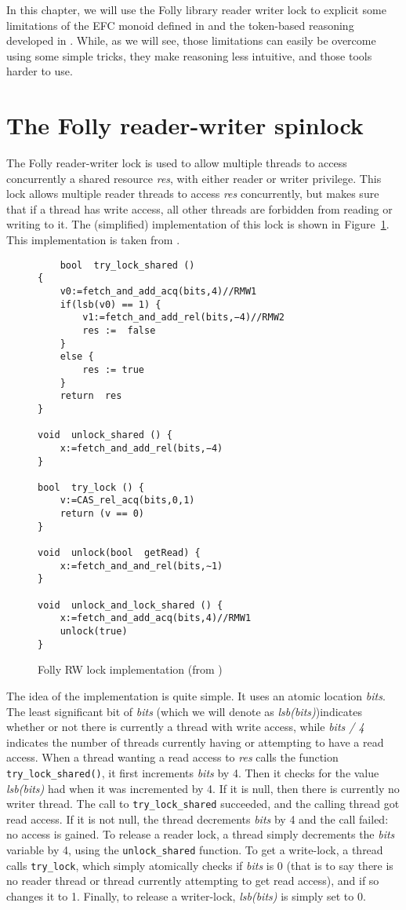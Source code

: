 \label{sec1}
In this chapter, we will use the Folly library reader writer lock \cite{follyRW} to explicit some limitations of the EFC monoid defined in \cite{gaurav} and the token-based reasoning developed in \cite{pascal}. While, as we will see, those limitations can easily be overcome using some simple tricks, they make reasoning less intuitive, and those tools harder to use.

\section{The Folly reader-writer spinlock}
The Folly reader-writer lock is used to allow multiple threads to access concurrently a shared resource \emph{res}, with either reader or writer privilege. This lock allows multiple reader threads to access \emph{res} concurrently, but makes sure that if a thread has write access, all other threads are forbidden from reading or writing to it. The (simplified) implementation of this lock is shown in Figure~\ref{fig:follyRWL}. This implementation is taken from \cite{gaurav}.

\begin{figure}
	\begin{lstlisting}
	bool  try_lock_shared ()
{
	v0:=fetch_and_add_acq(bits,4)//RMW1
	if(lsb(v0) == 1) {
		v1:=fetch_and_add_rel(bits,−4)//RMW2
		res :=  false
	}
	else {
		res := true
	}
	return  res
}

void  unlock_shared () {
	x:=fetch_and_add_rel(bits,−4)
}

bool  try_lock () {
	v:=CAS_rel_acq(bits,0,1)
	return (v == 0)
}

void  unlock(bool  getRead) {
	x:=fetch_and_and_rel(bits,∼1)
}

void  unlock_and_lock_shared () {
	x:=fetch_and_add_acq(bits,4)//RMW1
	unlock(true)
}
	\end{lstlisting}
\caption{Folly RW lock implementation (from \cite{gaurav})}
		\label{fig:follyRWL}
\end{figure}

The idea of the implementation is quite simple. It uses an atomic location \emph{bits}. The least significant bit of \emph{bits} (which we will denote as \emph{lsb(bits)})indicates whether or not there is currently a thread with write access, while \emph{bits / 4} indicates the number of threads currently having or attempting to have a read access. When a thread wanting a read access to \emph{res} calls the function \texttt{try\_lock\_shared()}, it first increments \emph{bits} by 4. Then it checks for the value \emph{lsb(bits)} had when it was incremented by 4. If it is null, then there is currently no writer thread. The call to \texttt{try\_lock\_shared} succeeded, and the calling thread got read access. If it is not null, the thread decrements \emph{bits} by 4 and the call failed: no access is gained. To release a reader lock, a thread simply decrements the \emph{bits} variable by 4, using the \texttt{unlock\_shared} function. To get a write-lock, a thread calls \texttt{try\_lock}, which simply atomically checks if \emph{bits} is 0 (that is to say there is no reader thread or thread currently attempting to get read access), and if so changes it to 1. Finally, to release a writer-lock, \emph{lsb(bits)} is simply set to 0.

